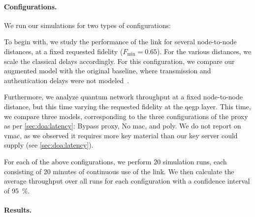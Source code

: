 \paragraph*{Configurations.}

We run our simulations for two types of configurations:
%
\begin{inlinelist}
    \item To begin with, we study the performance of the link for several node-to-node distances, at
          a fixed requested fidelity ($F_\text{min}=0.65$). For the various distances, we scale the
          classical delays accordingly. For this configuration, we compare our augmented model with
          the original baseline, where transmission and authentication delays were not
          modeled~\cite{dahlberg_2019_egp}.
    \item Furthermore, we analyze quantum network throughput at a fixed node-to-node distance, but
          this time varying the requested fidelity at the \acrshort{qegp} layer. This time, we
          compare three models, corresponding to the three configurations of the proxy as per
          \cref{sec:doa:latency}: Bypass proxy, No \acrshort{mac}, and \acrshort{poly}. We do not
          report on \acrshort{vmac}, as we observed it requires more key material than our key
          server could supply (see \cref{sec:doa:latency}).
\end{inlinelist}

For each of the above configurations, we perform \num{20} simulation runs, each consisting of
\num{20} minutes of continuous use of the link. We then calculate the average throughput over all
runs for each configuration with a confidence interval of \qty{95}{\percent}.

\paragraph*{Results.}

